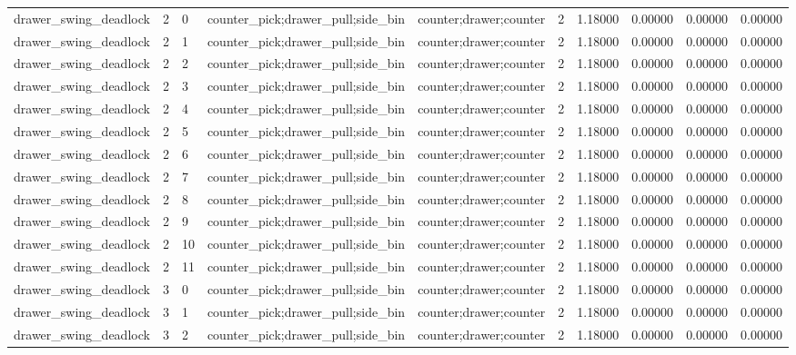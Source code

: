 \documentclass{article}
\begin{document}
\begin{table}[tbp]
{\begin{tabular}{llllllllll}
drawer\_swing\_deadlock & 2 & 0 & counter\_pick;drawer\_pull;side\_bin & counter;drawer;counter & 2 & 1.18000 & 0.00000 & 0.00000 & 0.00000 \\
drawer\_swing\_deadlock & 2 & 1 & counter\_pick;drawer\_pull;side\_bin & counter;drawer;counter & 2 & 1.18000 & 0.00000 & 0.00000 & 0.00000 \\
drawer\_swing\_deadlock & 2 & 2 & counter\_pick;drawer\_pull;side\_bin & counter;drawer;counter & 2 & 1.18000 & 0.00000 & 0.00000 & 0.00000 \\
drawer\_swing\_deadlock & 2 & 3 & counter\_pick;drawer\_pull;side\_bin & counter;drawer;counter & 2 & 1.18000 & 0.00000 & 0.00000 & 0.00000 \\
drawer\_swing\_deadlock & 2 & 4 & counter\_pick;drawer\_pull;side\_bin & counter;drawer;counter & 2 & 1.18000 & 0.00000 & 0.00000 & 0.00000 \\
drawer\_swing\_deadlock & 2 & 5 & counter\_pick;drawer\_pull;side\_bin & counter;drawer;counter & 2 & 1.18000 & 0.00000 & 0.00000 & 0.00000 \\
drawer\_swing\_deadlock & 2 & 6 & counter\_pick;drawer\_pull;side\_bin & counter;drawer;counter & 2 & 1.18000 & 0.00000 & 0.00000 & 0.00000 \\
drawer\_swing\_deadlock & 2 & 7 & counter\_pick;drawer\_pull;side\_bin & counter;drawer;counter & 2 & 1.18000 & 0.00000 & 0.00000 & 0.00000 \\
drawer\_swing\_deadlock & 2 & 8 & counter\_pick;drawer\_pull;side\_bin & counter;drawer;counter & 2 & 1.18000 & 0.00000 & 0.00000 & 0.00000 \\
drawer\_swing\_deadlock & 2 & 9 & counter\_pick;drawer\_pull;side\_bin & counter;drawer;counter & 2 & 1.18000 & 0.00000 & 0.00000 & 0.00000 \\
drawer\_swing\_deadlock & 2 & 10 & counter\_pick;drawer\_pull;side\_bin & counter;drawer;counter & 2 & 1.18000 & 0.00000 & 0.00000 & 0.00000 \\
drawer\_swing\_deadlock & 2 & 11 & counter\_pick;drawer\_pull;side\_bin & counter;drawer;counter & 2 & 1.18000 & 0.00000 & 0.00000 & 0.00000 \\
drawer\_swing\_deadlock & 3 & 0 & counter\_pick;drawer\_pull;side\_bin & counter;drawer;counter & 2 & 1.18000 & 0.00000 & 0.00000 & 0.00000 \\
drawer\_swing\_deadlock & 3 & 1 & counter\_pick;drawer\_pull;side\_bin & counter;drawer;counter & 2 & 1.18000 & 0.00000 & 0.00000 & 0.00000 \\
drawer\_swing\_deadlock & 3 & 2 & counter\_pick;drawer\_pull;side\_bin & counter;drawer;counter & 2 & 1.18000 & 0.00000 & 0.00000 & 0.00000 \\

\end{tabular}}
\end{table}
\end{document}
